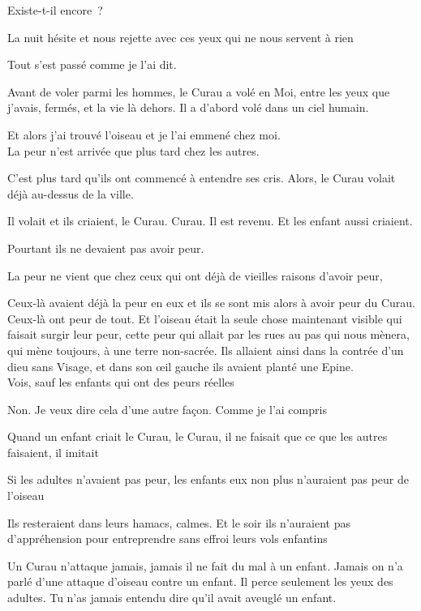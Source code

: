 Existe-t-il encore~?

La nuit hésite et nous rejette avec ces yeux qui ne nous servent à rien

Tout s'est passé comme je l'ai dit.

Avant de voler parmi les hommes, le Curau a volé en Moi, entre les yeux
que j'avais, fermés, et la vie là dehors. Il a d'abord volé dans un ciel
humain.

Et alors j'ai trouvé l'oiseau et je l'ai emmené chez moi.\\

La peur n'est arrivée que plus tard chez les autres.

C'est plus tard qu'ils ont commencé à entendre ses cris. Alors, le Curau
volait déjà au-dessus de la ville.

Il volait et ils criaient, le Curau. Curau. Il est revenu. Et les enfant
aussi criaient.

Pourtant ils ne devaient pas avoir peur.

La peur ne vient que chez ceux qui ont déjà de vieilles raisons d'avoir
peur,

Ceux-là avaient déjà la peur en eux et ils se sont mis alors à avoir
peur du Curau. Ceux-là ont peur de tout. Et l'oiseau était la seule
chose maintenant visible qui faisait surgir leur peur, cette peur qui
allait par les rues au pas qui nous mènera, qui mène toujours, à une
terre non-sacrée. Ils allaient ainsi dans la contrée d'un dieu sans
Visage, et dans son œil gauche ils avaient planté une Epine.\\

Vois, sauf les enfants qui ont des peurs réelles

Non. Je veux dire cela d'une autre façon. Comme je l'ai compris

Quand un enfant criait le Curau, le Curau, il ne faisait que ce que les
autres faisaient, il imitait

Si les adultes n'avaient pas peur, les enfants eux non plus n'auraient
pas peur de l'oiseau

Ils resteraient dans leurs hamacs, calmes. Et le soir ils n'auraient pas
d'appréhension pour entreprendre sans effroi leurs vols enfantins

Un Curau n'attaque jamais, jamais il ne fait du mal à un enfant. Jamais
on n'a parlé d'une attaque d'oiseau contre un enfant. Il perce seulement
les yeux des adultes. Tu n'as jamais entendu dire qu'il avait aveuglé un
enfant.\\

